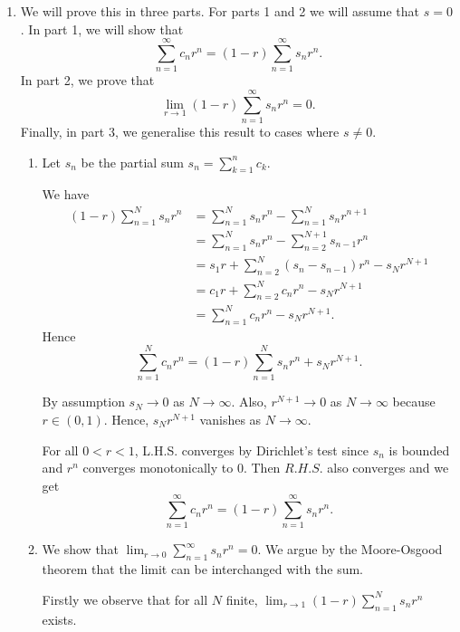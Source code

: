 \documentclass[oneside]{article}
\begin{document}
  \begin{enumerate}[label=(\alph*)]
    \item We will prove this in three parts. For parts 1 and 2 we will assume
    that $s = 0$. In part 1, we will show that \[
      \sum_{n=1}^\infty c_nr^n = (1-r) \sum_{n=1}^\infty s_nr^n \text{.}
    \] In part 2, we prove that \[
      \lim_{r\to1}(1-r) \sum_{n=1}^\infty s_nr^n = 0 \text{.}
    \] Finally, in part 3, we generalise this result to cases where $s \neq 0$.

    \begin{enumerate}[label=\textbf{\arabic*.}]
      \item
        Let $s_n$ be the partial sum $s_n = \sum_{k=1}^n c_k$.

        We have \begin{align*}
          (1-r)\sum_{n=1}^Ns_nr^n %
          &= \sum_{n=1}^Ns_nr^n - \sum_{n=1}^Ns_nr^{n+1} \\
          &= \sum_{n=1}^Ns_nr^n - \sum_{n=2}^{N+1}s_{n-1}r^n \\
          &= s_1r + \sum_{n=2}^N(s_n - s_{n-1})r^n - s_Nr^{N+1} \\
          &= c_1r + \sum_{n=2}^Nc_nr^n - s_Nr^{N+1} \\
          &= \sum_{n=1}^Nc_nr^n - s_Nr^{N+1} \text{.}
        \end{align*} Hence \[
          \sum_{n=1}^Nc_nr^n = (1-r)\sum_{n=1}^Ns_nr^n + s_Nr^{N+1} \text{.}
        \]

        By assumption $s_N \to 0$ as $N\to\infty$. Also, $r^{N+1} \to 0$ as
        $N\to\infty$ because $r \in (0, 1)$. Hence, $s_Nr^{N+1}$ vanishes as
        $N \to \infty$.

        For all $0 < r < 1$, L.H.S. converges by Dirichlet's test since $s_n$ is
        bounded and $r^n$ converges monotonically to $0$. Then $R.H.S.$ also
        converges and we get\[
          \sum_{n=1}^\infty c_nr^n = (1-r)\sum_{n=1}^\infty s_nr^n \text{.}
        \]

      \item We show that $\lim_{r\to0}\sum_{n=1}^\infty s_nr^n=0$. We argue by
        the Moore-Osgood theorem that the limit can be interchanged with the
        sum.

        Firstly we observe that for all $N$ finite,
        $\lim_{r\to1}(1-r)\sum_{n=1}^N s_nr^n$ exists.


\end{enumerate}
\end{enumerate}
\end{document}
